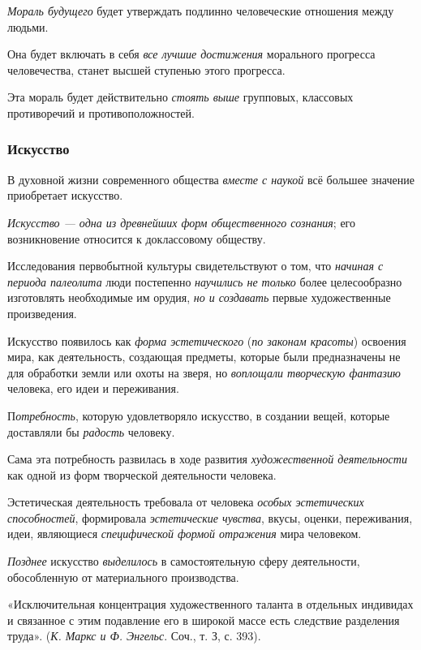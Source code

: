 \documentclass[a4paper,14pt,russian]{extreport}
\begin{document}
\emph{Мораль будущего} будет утверждать подлинно человеческие отношения между людьми.

Она будет включать в себя \emph{все лучшие достижения} морального прогресса человечества, станет высшей ступенью этого прогресса.

Эта мораль будет действительно \emph{стоять выше} групповых, классовых противоречий и противоположностей.

\subsubsection{Искусство}

В духовной жизни современного общества \emph{вместе с наукой} всё большее значение приобретает искусство.

\emph{Искусство --- одна из древнейших форм общественного сознания}; его возникновение относится к доклассовому обществу.

Исследования первобытной культуры свидетельствуют о том, что \emph{начиная с периода палеолита} люди постепенно \emph{научились не только} более целесообразно изготовлять необходимые им орудия, \emph{но и создавать} первые художественные произведения.

Искусство появилось как \emph{форма эстетического} (\emph{по законам красоты}) освоения мира, как деятельность, создающая предметы, которые были предназначены не для обработки земли или охоты на зверя, но \emph{воплощали творческую фантазию} человека, его идеи и переживания.

П\emph{отребность}, которую удовлетворяло искусство, в создании вещей, которые доставляли бы \emph{радость} человеку.

Сама эта потребность развилась в ходе развития \emph{художественной деятельности} как одной из форм творческой деятельности человека.

Эстетическая деятельность требовала от человека \emph{особых эстетических способностей}, формировала \emph{эстетические чувства}, вкусы, оценки, переживания, идеи, являющиеся \emph{специфической формой отражения} мира человеком.

\emph{Позднее} искусство \emph{выделилось} в самостоятельную сферу деятельности, обособленную от материального производства.

«Исключительная концентрация художественного таланта в отдельных индивидах и связанное с этим подавление его в широкой массе есть следствие разделения труда». (\emph{К. Маркс и Ф. Энгельс}. Соч., т. З, с. 393).
\end{document}
